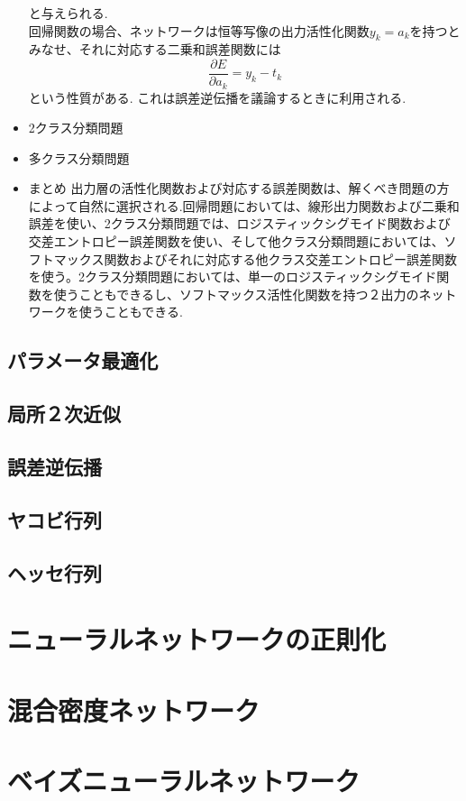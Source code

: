 \documentclass[11pt,a4paper]{jsarticle}
\begin{document}
\begin{itemize}
\begin{equation}
  \end{equation}
  と与えられる.\\
  回帰関数の場合、ネットワークは恒等写像の出力活性化関数$y_k = a_k$を持つとみなせ、それに対応する二乗和誤差関数には\\
  \begin{equation}
    \frac{\partial E}{\partial a_k} = y_k - t_k
  \end{equation}
  という性質がある. これは誤差逆伝播を議論するときに利用される.
  \item 2クラス分類問題
  \item 多クラス分類問題
  \item まとめ
  出力層の活性化関数および対応する誤差関数は、解くべき問題の方によって自然に選択される.回帰問題においては、線形出力関数および二乗和誤差を使い、2クラス分類問題では、ロジスティックシグモイド関数および交差エントロピー誤差関数を使い、そして他クラス分類問題においては、ソフトマックス関数およびそれに対応する他クラス交差エントロピー誤差関数を使う。2クラス分類問題においては、単一のロジスティックシグモイド関数を使うこともできるし、ソフトマックス活性化関数を持つ２出力のネットワークを使うこともできる.
\end{itemize}
\subsection*{パラメータ最適化}
\subsection*{局所２次近似}
\subsection*{誤差逆伝播}
\subsection*{ヤコビ行列}
\subsection*{ヘッセ行列}
\section{ニューラルネットワークの正則化}
\section{混合密度ネットワーク}
\section{ベイズニューラルネットワーク}
\end{document}
